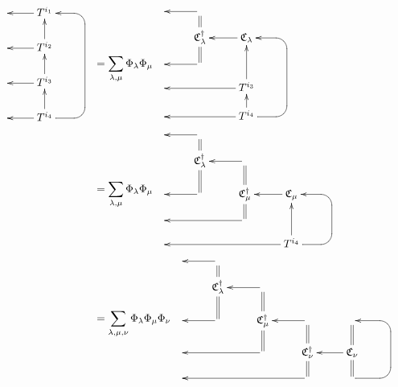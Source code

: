 \begin{align}
\bcen
\xymatrix@R=.5pc{
&\ar[l]\ar@{<-}[dd]T^{i_1}&
\\&&
\\&\ar[l]\ar@{<-}[dd]T^{i_2}&
\\&&
\\&\ar[l]\ar@{<-}[dd]T^{i_3}&
\\&&
\\&\ar[l]T^{i_4}
\ar`r[ru]
`[uuuuuu]
[uuuuuu]
&
}
\ecen
&=
\sum_{\lam, \mu}
{\Phi_\lam}
{\Phi_\mu}
\bcen
\xymatrix@R=1pc{
&\ar[l]
&
&
\\
&\ger{C}_\lam^\dagger
\ar@2{-}[u]
\ar@2{-}[d]
&\ar[l]
\ger{C}_\lam
&
\\
&\ar[l]
&
&
\\
&
&\ar@{<-}[d]T^{i_3}\ar[ll]
\ar[uu]
&
\\
&&
\ar`r[ru]`[uuu][uuu]T^{i_4}
\ar[ll]
&
}
\ecen
\\
&=
\sum_{\lam, \mu}
{\Phi_\lam}
{\Phi_\mu}
\bcen
\xymatrix@R=1pc{
&\ar[l]
&
&
\\
&\ger{C}_\lam^\dagger
\ar@2{-}[u]
\ar@2{-}[d]
&\ar[l]&
\\
&\ar[l]
&\ger{C}_\mu^\dagger
\ar@2{-}[u]
\ar@2{-}[d]
&\ar@{<-}[dd]\ger{C}_\mu
\ar[l]
\\
&&\ar[ll]
&
&
\\
&&&\ar[lll]
\ar`r[ru]`[uu][uu]T^{i_4}
&
}
\ecen
\\
&= 
\sum_{\lam, \mu, \nu}
{\Phi_\lam}
{\Phi_\mu}
{\Phi_\nu}
\bcen
\xymatrix@R=1pc{
&\ar[l]
&&&&
\\
&\ger{C}_\lam^\dagger
\ar@2{-}[u]
\ar@2{-}[d]
&\ar[l]
&
&
\\
&\ar[l]
&\ger{C}_\mu^\dagger
\ar@2{-}[u]
\ar@2{-}[d]
&\ar[l]
&&
\\
&&\ar[ll]
&
\ger{C}_\nu^\dagger
\ar@2{-}[u]
\ar@2{-}[d]
&\ger{C}_\nu\ar[l]
\ar@2{-}[u]
\ar@2{-}[d]
&
\\
&&&\ar[lll]
&
\ar`r[ru]
`[uu]
[uu]
&
}
\ecen
\end{align}
